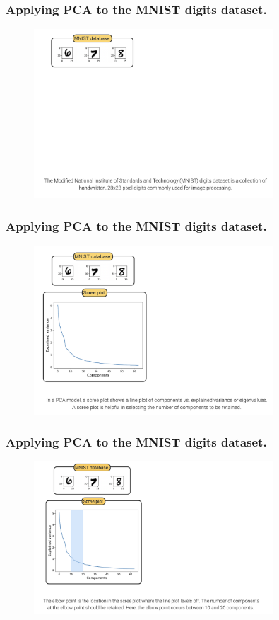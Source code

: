 \documentclass[8pt,dvipsnames]{beamer}
\begin{document}
\begin{frame}
    \frametitle{Applying PCA to the MNIST digits dataset.}
    \begin{figure}[ht]
        \centering
        \includegraphics[width=0.8\textwidth]{imgs/DR_5.png}
    \end{figure}
\end{frame}

\begin{frame}
    \frametitle{Applying PCA to the MNIST digits dataset.}
    \begin{figure}[ht]
        \centering
        \includegraphics[width=0.8\textwidth]{imgs/DR_6.png}
    \end{figure}
\end{frame}

\begin{frame}
    \frametitle{Applying PCA to the MNIST digits dataset.}
    \begin{figure}[ht]
        \centering
        \includegraphics[width=0.8\textwidth]{imgs/DR_7.png}
    \end{figure}
\end{frame}
\end{document}
